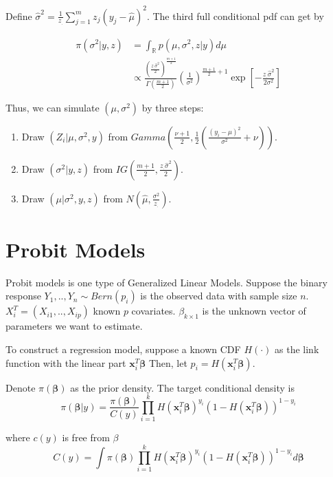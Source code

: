 \documentclass[12pt]{article}
\begin{document}
Define \(\hat\sigma^2=\frac{1}{z_{.}}\sum_{j=1}^mz_j(y_j-\hat\mu)^2\).
The third full conditional pdf can get by

\[\begin{aligned}
\pi(\sigma^2|y,z)&= \int_{\mathbb{R}}p(\mu,\sigma^2,z|y)d\mu\\
               &\propto \frac{(\frac{z_{.}\hat\sigma^2}2)^{\frac{m+1}2}}{\Gamma(\frac{m+1}2)} (\frac1{\sigma^2})^{\frac{m+1}{2}+1}\exp\left[-\frac{z_{.}\hat\sigma^2}{2\sigma^2}\right]
\end{aligned}\]

Thus, we can simulate \((\mu,\sigma^2)\) by three steps:

\begin{enumerate}
\def\labelenumi{\arabic{enumi}.}
\item
  Draw \((Z_i|\mu,\sigma^2,y)\) from
  \(Gamma(\frac{\nu+1}2,\frac{1}2(\frac{(y_i-\mu)^2}{\sigma^2}+\nu))\).
\item
  Draw \((\sigma^2|y,z)\) from
  \(IG(\frac{m+1}2,\frac{z_{.}\hat\sigma^2}2)\).
\item
  Draw \((\mu|\sigma^2,y,z)\) from
  \(N(\hat\mu,\frac{\sigma^2}{z_{.}})\).
\end{enumerate}

\hypertarget{probit-models}{%
\section{Probit Models}\label{probit-models}}

Probit models is one type of Generalized Linear Models. Suppose the
binary response \(Y_1,..,Y_n\sim Bern(p_i)\) is the observed data with
sample size \(n\). \(X_i^T=(X_{i1},..,X_{ip})\) known \(p\) covariates.
\(\beta_{k\times1}\) is the unknown vector of parameters we want to
estimate.

To construct a regression model, suppose a known CDF \(H(\cdot)\) as the
link function with the linear part \(\mathbf{x}_i^T\boldsymbol{\beta}\)
Then, let \(p_i=H(\mathbf{x}_i^T\boldsymbol{\beta})\).

Denote \(\pi(\boldsymbol{\beta})\) as the prior density. The target
conditional density is \[
\pi(\boldsymbol{\beta}|y) = \frac{\pi(\boldsymbol{\beta})}{C(y)}\prod_{i=1}^{k}H (\mathbf{x}_i^T\boldsymbol{\beta})^{y_i}(1-H(\mathbf{x}_i^T\boldsymbol{\beta}))^{1-y_i}
\]

where \(c(y)\) is free from \(\beta\)
\[C(y)=\int\pi(\boldsymbol{\beta})\prod_{i=1}^{k}H (\mathbf{x}_i^T\boldsymbol{\beta})^{y_i}(1-H(\mathbf{x}_i^T\boldsymbol{\beta}))^{1-y_i}d\boldsymbol{\beta}\]
\end{document}
